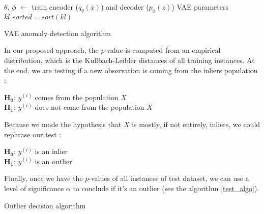 \begin{center}
	\begin{algorithm}[H] \label{anomaly_algo}
		\SetAlgoLined
		$\theta$, $\phi$ $\leftarrow$ train encoder ($q_{\theta}(x)$) and decoder ($p_{\phi}(z)$) VAE parameters\;
		$kl\_sorted = sort(kl)$\;
		\caption{VAE anomaly detection algorithm}
	\end{algorithm}
\end{center}

In our proposed approach, the $p$-value is computed from an empirical distribution, which is the Kullbach-Leibler distances of all training instances. At the end, we are testing if a new observation is coming from the inliers population :

\begin{center}
	$\boldsymbol{H_0}$: $y^{(i)}$ comes from the population $X$ \\
	$\boldsymbol{H_1}$: $y^{(i)}$ does not come from the population $X$
\end{center}

\noindent Because we made the hypothesis that $X$ is mostly, if not entirely, inliers, we could rephrase our test :

\begin{center}
	$\boldsymbol{H_0}$: $y^{(i)}$ is an inlier \\
	$\boldsymbol{H_1}$: $y^{(i)}$ is an outlier
\end{center}

Finally, once we have the $p$-values of all instances of test dataset, we can use a level of significance $\alpha$ to conclude if it's an outlier (see the algorithm \ref{test_algo}).

\begin{center}
	\begin{algorithm}[H] \label{test_algo}
		\SetAlgoLined
		\caption{Outlier decision algorithm}
	\end{algorithm}
\end{center}

